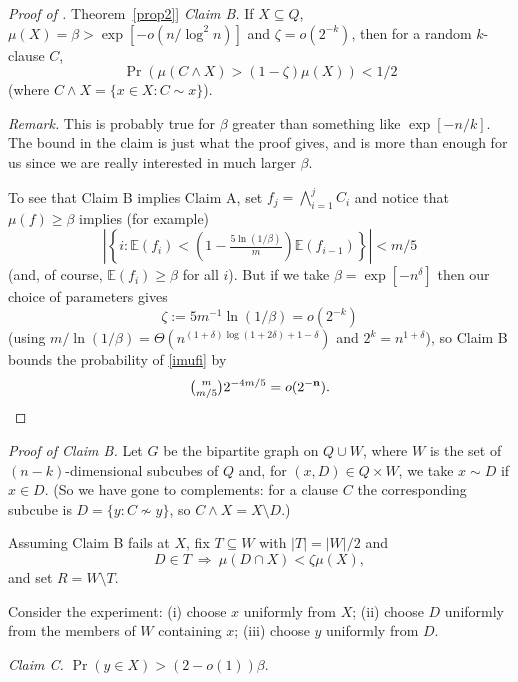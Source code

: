 \documentclass[11pt]{article}
\numberwithin{equation}{section}
\theoremstyle{definition}
\theoremstyle{plain}
\newcommand{\expref}[2]{\hyperref[#2]{#1~\ref{#2}}}
\newcommand{\nn}[0]{{\bf n}}
\newcommand{\beq}[1]{\begin{equation}\label{#1}}
\newcommand{\enq}[0]{\end{equation}}
\newcommand{\mn}[0]{\medskip\noindent}
\newcommand{\sub}[0]{\subseteq}
\newcommand{\sm}[0]{\setminus}
\newcommand{\Ra}[0]{\Rightarrow}
\newcommand{\TTT}[0]{R}
\newcommand{\SSS}[0]{T}
\newcommand{\0}[0]{\emptyset}
\newcommand{\Cc}[0]{\tbinom}
\newcommand{\gb}[0]{\beta }
\newcommand{\gd}[0]{\delta }
\newcommand{\gz}[0]{\zeta}
\begin{document}
\begin{proof}[Proof of \expref{Theorem}{prop2}]
\mn
\emph{Claim B.}
If $X\sub Q$,
$\mu (X) =\gb> \exp[-o(n/\log^2n)]$ and $\gz =o(2^{-k})$,
then for a random $k$-clause $C$,
$$
\Pr(\mu (C\wedge X) >(1-\gz)\mu (X)) < 1/2
$$
(where $C\wedge X =\{x\in X: C\sim x\}$).


\mn
\emph{Remark.}  This is probably true for
$\gb$ greater than something like $\exp[-n/k]$.
The bound in the claim
is just what the proof gives, and is more than enough
for us since %
we are %
really interested in much larger $\gb$.


\medskip
To see that Claim B implies Claim A,
set $f_j=\bigwedge_{i=1}^jC_i$ and notice that $\mu(f) \geq \gb$
implies (for example)
\beq{imufi}
%
%
\left|\left\{i: \mathbb E (f_i) <\left(1-\tfrac{5\ln(1/\gb)}{m}\right)
\mathbb E (f_{i-1})\right\}\right| < m/5
%
\enq
(and, of course, $\mathbb E (f_i)\geq \gb$ for all $i$).
But if we take
$\gb =\exp[-n^{\gd}]$ then our choice of parameters gives
$$\gz:=5m^{-1}\ln(1/\gb) =o(2^{-k})$$
(using $m/\ln (1/\gb) =
\Theta(n^{(1+\gd)\log (1+2\gd)+1-\gd})$ and
$2^k = n^{1+\gd}$),
so Claim B bounds the probability of \eqref{imufi} by
%
\begin{equation*}
\Cc{m}{m/5} 2^{-4m/5} =o(2^{-\nn}).   \qedhere    %
\end{equation*}
%
\end{proof}   %

\mn
\emph{Proof of Claim B.}
Let $G$ be the bipartite graph on
$Q\cup W$, where $W$ is the set of $(n-k)$-dimensional
subcubes of $Q$ and, for $(x,D)\in Q\times W$,
we take $x\sim D$ if $x\in D$.
(So %
we have  %
gone to complements:  for a clause $C$
the corresponding subcube is $D=\{y:C\not\sim y\}$,
so $C\wedge X =X\sm D$.)

Assuming Claim B fails at $X$, fix $\SSS \sub W$ with $|\SSS |=|W|/2$ and
$$D\in \SSS
  ~\Ra ~\mu (D\cap X) < \gz\mu(X),$$
and set $\TTT =W\sm \SSS $.

%
Consider the experiment:  %
(i) choose $x$ uniformly from $X$;
(ii)  choose $D$ uniformly from the members of $W$ containing $x$;
(iii)  choose $y$ uniformly from $D$.


\mn
\emph{Claim C.}  $\Pr(y\in X)> (2-o(1))\gb$.
\end{document}

